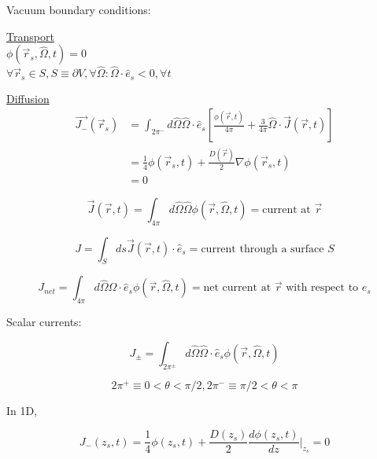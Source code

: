 \documentclass[12pt]{article}
\newcommand{\rvec}{\ensuremath{\vec{r}}}
\newcommand{\omvec}{\ensuremath{\hat{\Omega}}}
\begin{document}
Vacuum boundary conditions:

\begin{minipage}[t]{0.5\textwidth}
\underline{Transport} \\
$\phi(\rvec_s,\omvec,t) = 0$ \\
$\forall\rvec_s \in S, S \equiv \partial V, \forall \omvec: \omvec\cdot\hat{e}_s<0, \forall t$
\end{minipage}
\begin{minipage}[t]{0.5\textwidth}
\underline{Diffusion} \\
\vspace{-10 mm}
\begin{align*}
\vec{J_-}(\rvec_s) &= \int_{2\pi^-}d\omvec\omvec\cdot\hat{e}_s
\left[\frac{\phi(\rvec,t)}{4\pi} + \frac{3}{4\pi}\omvec\cdot\vec{J}(\rvec,t)\right] \\
&= \frac{1}{4}\phi(\rvec_s,t) + \frac{D(\rvec)}{2}\nabla\phi(\rvec_s,t) \\
&= 0
\end{align*}
\end{minipage}

\begin{equation*}
\vec{J}(\rvec,t) = \int_{4\pi}d\omvec\omvec\phi(\rvec,\omvec,t) = \text{current at $\rvec$}
\end{equation*}

\begin{equation*}
J = \int_Sds\vec{J}(\rvec,t)\cdot\hat{e}_s = \text{current through a surface $S$}
\end{equation*}

\begin{equation*}
J_{net} = \int_{4\pi}d\omvec\omvec\cdot\hat{e}_s\phi(\rvec,\omvec,t) 
= \text{net current at $\rvec$ with respect to $\hat{e}_s$}
\end{equation*}

Scalar currents:

\begin{equation*}
J_{\pm} = \int_{2\pi^{\pm}}d\omvec\omvec\cdot\hat{e}_s\phi(\rvec,\omvec,t)
\end{equation*}

\begin{equation*}
2\pi^+ \equiv 0 < \theta < \pi/2, 2\pi^- \equiv \pi/2 < \theta < \pi
\end{equation*}

In 1D,

\begin{equation*}
J_-(z_s,t) = \frac{1}{4}\phi(z_s,t) + \frac{D(z_s)}{2}\frac{d\phi(z_s,t)}{dz}\Bigr|_{z_s} = 0
\end{equation*}
\end{document}
